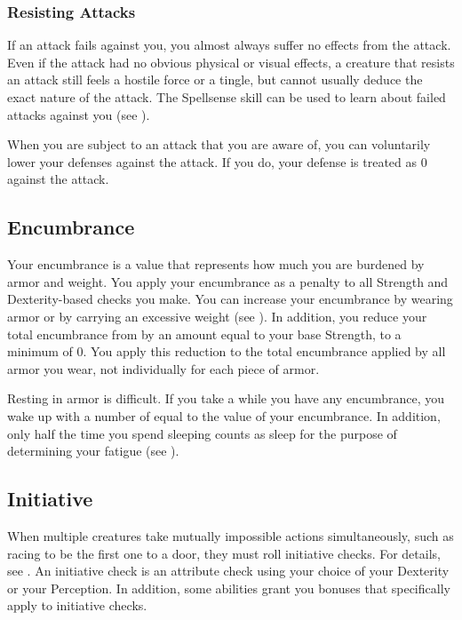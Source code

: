         \subsubsection{Resisting Attacks}
            If an attack fails against you, you almost always suffer no effects from the attack.
            Even if the attack had no obvious physical or visual effects, a creature that resists an attack still feels a hostile force or a tingle, but cannot usually deduce the exact nature of the attack.
            The Spellsense skill can be used to learn about failed  attacks against you (see ).

             When you are subject to an attack that you are aware of, you can voluntarily lower your defenses against the attack.
            If you do, your defense is treated as 0 against the attack.

    \subsection{Encumbrance}\label{Encumbrance}
        Your encumbrance is a value that represents how much you are burdened by armor and weight.
        You apply your encumbrance as a penalty to all Strength and Dexterity-based checks you make.
        You can increase your encumbrance by wearing armor or by carrying an excessive weight (see ).
        In addition, you reduce your total encumbrance from  by an amount equal to your base Strength, to a minimum of 0.
        You apply this reduction to the total encumbrance applied by all armor you wear, not individually for each piece of armor.

        Resting in armor is difficult.
        If you take a  while you have any encumbrance, you wake up with a number of  equal to the value of your encumbrance.
        In addition, only half the time you spend sleeping counts as sleep for the purpose of determining your fatigue (see ).

    \subsection{Initiative}\label{Initiative}
        When multiple creatures take mutually impossible actions simultaneously, such as racing to be the first one to a door, they must roll initiative checks.
        For details, see .
        An initiative check is an attribute check using your choice of your Dexterity or your Perception.
        In addition, some abilities grant you bonuses that specifically apply to initiative checks.

